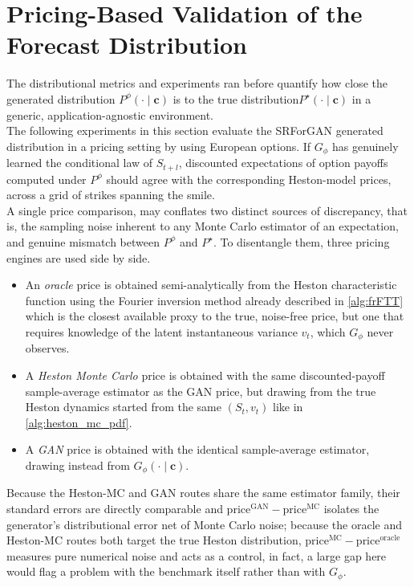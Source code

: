 \section{Pricing-Based Validation of the Forecast Distribution}
\label{sec:pricing_validation}


The distributional metrics and experiments ran before quantify how close 
the generated distribution $P^\phi(\cdot\mid\mathbf c)$
is to the true distribution$P^\star(\cdot\mid\mathbf c)$ in a generic, application-agnostic environment.\\
The following experiments in this section evaluate the SRForGAN generated distribution in a pricing setting by using European options.
If $G_\phi$ has genuinely learned the conditional law of
$S_{t+l}$, discounted expectations of option payoffs computed under
$P^\phi$ should agree with the corresponding Heston-model prices, across
a grid of strikes spanning the smile.\\

A single price comparison, may conflates two distinct sources of
discrepancy, that is, the sampling noise inherent to any Monte Carlo estimator of
an expectation, and genuine mismatch between $P^\phi$ and $P^\star$. To
disentangle them, three pricing engines are used side by side.
\begin{itemize}
    \item An \emph{oracle} price is obtained semi-analytically from the Heston
characteristic function using the Fourier inversion method already described in \ref{alg:frFTT} 
which is the closest available proxy to the true,
noise-free price, but one that requires knowledge of the latent
instantaneous variance $v_t$, which $G_\phi$ never observes.
    \item A \emph{Heston Monte Carlo} price is obtained with the same
discounted-payoff sample-average estimator as the GAN price, but drawing
from the true Heston dynamics started from the
same $(S_t,v_t)$ like in \ref{alg:heston_mc_pdf}.
    \item A \emph{GAN} price is obtained with the identical
sample-average estimator, drawing instead from $G_\phi(\cdot\mid\mathbf
c)$.
\end{itemize}
   
Because the Heston-MC and GAN routes share the same estimator
family, their standard errors are directly comparable and
$\text{price}^{\text{GAN}}-\text{price}^{\text{MC}}$ isolates the
generator's distributional error net of Monte Carlo noise; because the
oracle and Heston-MC routes both target the true Heston distribution,
$\text{price}^{\text{MC}}-\text{price}^{\text{oracle}}$ measures pure
numerical noise and acts as a control, in fact, a large gap here would flag a
problem with the benchmark itself rather than with $G_\phi$.

